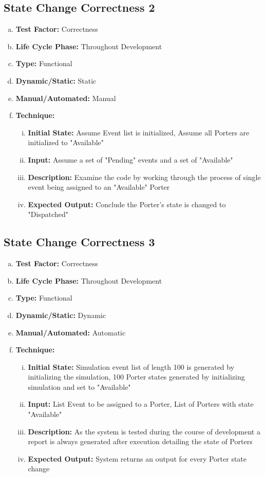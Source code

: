 \documentclass[paper=letter, fontsize=10pt]{scrartcl}
\numberwithin{equation}{section}		%
\numberwithin{figure}{section}			%
\numberwithin{table}{section}				%
\begin{document}
\subsection{State Change Correctness 2}
\begin{enumerate}[(a)]
	\item \textbf{Test Factor:} Correctness
	\item \textbf{Life Cycle Phase:} Throughout Development
	\item \textbf{Type:} Functional
	\item \textbf{Dynamic/Static:} Static
	\item \textbf{Manual/Automated:} Manual
	\item \textbf{Technique:}
		\begin{enumerate}[(i)]
			\item \textbf{Initial State:} Assume Event list is initialized, Assume all Porters are initialized to "Available"
			\item \textbf{Input:} Assume a set of "Pending" events and a set of "Available"  
			\item \textbf{Description:} Examine the code by working through the process of single event being assigned to an "Available" Porter
			\item \textbf{Expected Output:} Conclude the Porter's state is changed to "Dispatched"
		\end{enumerate}
\end{enumerate}

\subsection{State Change Correctness 3}
\begin{enumerate}[(a)]
	\item \textbf{Test Factor:} Correctness
	\item \textbf{Life Cycle Phase:} Throughout Development
	\item \textbf{Type:} Functional
	\item \textbf{Dynamic/Static:} Dynamic
	\item \textbf{Manual/Automated:} Automatic
	\item \textbf{Technique:}
		\begin{enumerate}[(i)]
			\item \textbf{Initial State:} Simulation event list of length 100 is generated by initializing the simulation, 100 Porter states generated by initializing simulation and set to "Available"
			\item \textbf{Input:} List Event to be assigned to a Porter, List of Porters with state "Available"
			\item \textbf{Description:} As the system is tested during the course of development a report is always generated after execution detailing the state of Porters
			\item \textbf{Expected Output:} System returns an output for every Porter state change
		\end{enumerate}
\end{enumerate}
\end{document}
